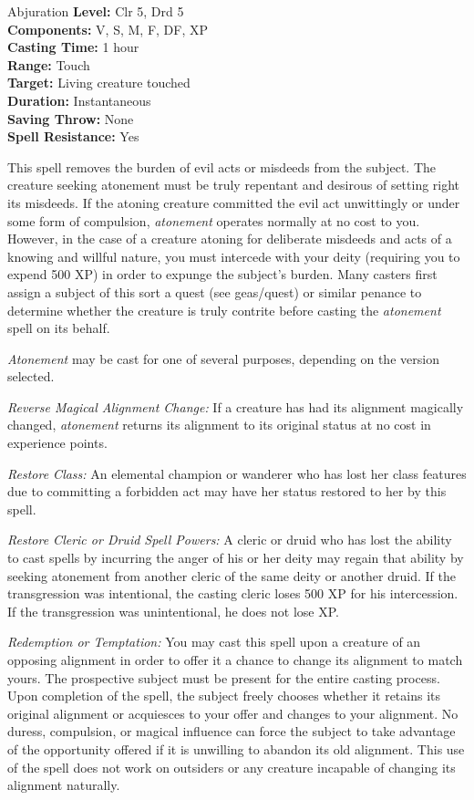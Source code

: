 {Abjuration}
{
	\textbf{Level:}
	Clr 5, Drd 5\\
	\textbf{Components:}
	V, S, M, F, DF, XP\\
	\textbf{Casting Time:}
	1 hour\\
	\textbf{Range:}
	Touch\\
	\textbf{Target:}
	Living creature touched\\
	\textbf{Duration:}
	Instantaneous\\
	\textbf{Saving Throw:}
	None\\
	\textbf{Spell Resistance:}
	Yes\\
}
{
	This spell removes the burden of evil acts or misdeeds from the subject. The creature seeking atonement must be truly repentant and desirous of setting right its misdeeds. If the atoning creature committed the evil act unwittingly or under some form of compulsion, \emph{atonement} operates normally at no cost to you. However, in the case of a creature atoning for deliberate misdeeds and acts of a knowing and willful nature, you must intercede with your deity (requiring you to expend 500 XP) in order to expunge the subject's burden. Many casters first assign a subject of this sort a quest (see geas/quest) or similar penance to determine whether the creature is truly contrite before casting the \emph{atonement} spell on its behalf.

	\emph{Atonement} may be cast for one of several purposes, depending on the version selected.

	\textit{Reverse Magical Alignment Change:}
	If a creature has had its alignment magically changed, \emph{atonement} returns its alignment to its original status at no cost in experience points.

	\textit{Restore Class:}
	An elemental champion or wanderer who has lost her class features due to committing a forbidden act may have her status restored to her by this spell.

	\textit{Restore Cleric or Druid Spell Powers:}
	A cleric or druid who has lost the ability to cast spells by incurring the anger of his or her deity may regain that ability by seeking atonement from another cleric of the same deity or another druid. If the transgression was intentional, the casting cleric loses 500 XP for his intercession. If the transgression was unintentional, he does not lose XP.

	\textit{Redemption or Temptation:}
	You may cast this spell upon a creature of an opposing alignment in order to offer it a chance to change its alignment to match yours. The prospective subject must be present for the entire casting process. Upon completion of the spell, the subject freely chooses whether it retains its original alignment or acquiesces to your offer and changes to your alignment. No duress, compulsion, or magical influence can force the subject to take advantage of the opportunity offered if it is unwilling to abandon its old alignment. This use of the spell does not work on outsiders or any creature incapable of changing its alignment naturally.

}
